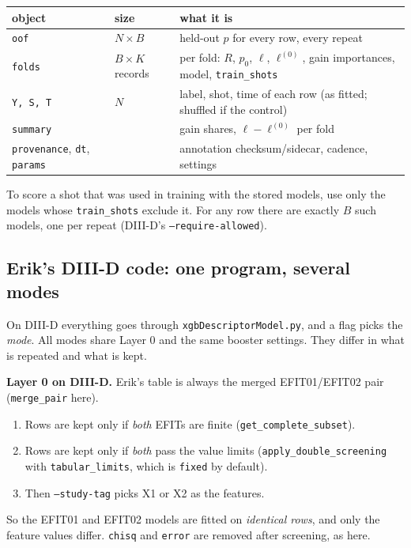 \documentclass[11pt]{article}
\begin{document}
\begin{center}\small
\begin{tabular}{lll}
\toprule
object & size & what it is \\
\midrule
\texttt{oof} & $N\times B$ & held-out $p$ for every row, every repeat\\
\texttt{folds} & $B\times K$ records & per fold: $R$, $p_0$, $\ell$, $\ell^{(0)}$, gain importances, model, \texttt{train\_shots}\\
\texttt{Y, S, T} & $N$ & label, shot, time of each row (as fitted; shuffled if the control)\\
\texttt{summary} & & gain shares, $\ell-\ell^{(0)}$ per fold\\
\texttt{provenance}, \texttt{dt}, \texttt{params} & & annotation checksum/sidecar, cadence, settings\\
\bottomrule
\end{tabular}
\end{center}

To score a shot that was used in training with the stored models, use only the
models whose \texttt{train\_shots} exclude it. For any row there are exactly
$B$ such models, one per repeat (DIII-D's \texttt{--require-allowed}).

\subsection{Erik's DIII-D code: one program, several modes}\label{sec:d3dmodes}

On DIII-D everything goes through \texttt{xgbDescriptorModel.py}, and a flag
picks the \emph{mode}. All modes share Layer 0 and the same booster settings.
They differ in what is repeated and what is kept.

\textbf{Layer 0 on DIII-D.} Erik's table is always the merged EFIT01/EFIT02
pair (\texttt{merge\_pair} here).
\begin{enumerate}
\item Rows are kept only if \emph{both} EFITs are finite
  (\texttt{get\_complete\_subset}).
\item Rows are kept only if \emph{both} pass the value limits
  (\texttt{apply\_double\_screening} with \texttt{tabular\_limits}, which is
  \texttt{fixed} by default).
\item Then \texttt{--study-tag} picks X1 or X2 as the features.
\end{enumerate}
So the EFIT01 and EFIT02 models are fitted on \emph{identical rows}, and only
the feature values differ. \texttt{chisq} and \texttt{error} are removed after
screening, as here.
\end{document}
